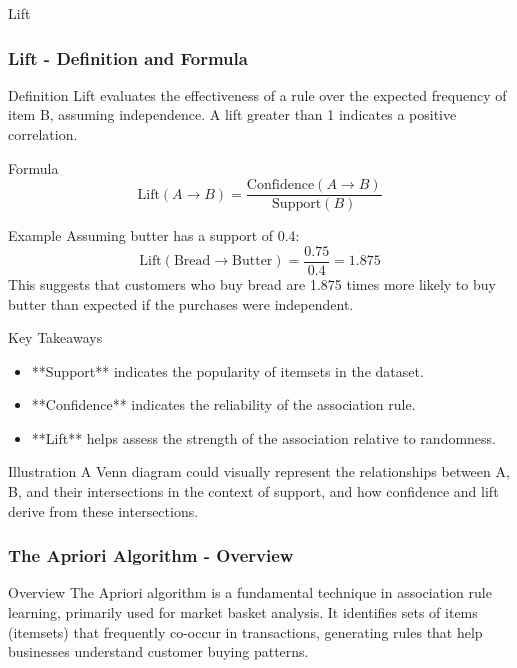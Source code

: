 \documentclass[aspectratio=169]{beamer}
\begin{document}
\begin{frame}[fragile]{Lift}
    \frametitle{Lift - Definition and Formula}
    \begin{block}{Definition}
        Lift evaluates the effectiveness of a rule over the expected frequency of item B, assuming independence. A lift greater than 1 indicates a positive correlation.
    \end{block}

    \begin{block}{Formula}
        \begin{equation}
            \text{Lift}(A \rightarrow B) = \frac{\text{Confidence}(A \rightarrow B)}{\text{Support}(B)}
        \end{equation}
    \end{block}

    \begin{block}{Example}
        Assuming butter has a support of 0.4:
        \begin{equation}
            \text{Lift}(\text{Bread} \rightarrow \text{Butter}) = \frac{0.75}{0.4} = 1.875
        \end{equation}
        This suggests that customers who buy bread are 1.875 times more likely to buy butter than expected if the purchases were independent.
    \end{block}
\end{frame}

\begin{frame}[fragile]{Key Takeaways}
    \begin{itemize}
        \item **Support** indicates the popularity of itemsets in the dataset.
        \item **Confidence** indicates the reliability of the association rule.
        \item **Lift** helps assess the strength of the association relative to randomness.
    \end{itemize}

    \begin{block}{Illustration}
        A Venn diagram could visually represent the relationships between A, B, and their intersections in the context of support, and how confidence and lift derive from these intersections.
    \end{block}
\end{frame}

\begin{frame}[fragile]
    \frametitle{The Apriori Algorithm - Overview}
    \begin{block}{Overview}
        The Apriori algorithm is a fundamental technique in association rule learning, primarily used for market basket analysis. It identifies sets of items (itemsets) that frequently co-occur in transactions, generating rules that help businesses understand customer buying patterns.
    \end{block}
\end{frame}
\end{document}

